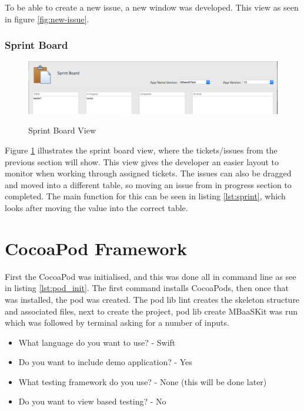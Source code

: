 To be able to create a new issue, a new window was developed. This view as seen in figure \ref{fig:new-issue}.

\subsubsection{Sprint Board}

\begin{figure}[!h]
    \caption{Sprint Board View}
    \centering
    \includegraphics[width=150mm]{images/dashboard/sprint-board}
    \label{fig:sprint-board-view}
\end{figure} 

Figure \ref{fig:sprint-board-view} illustrates the sprint board view, where the tickets/issues from the previous section will show. This view gives the developer an easier layout to monitor when working through assigned tickets. The issues can also be dragged and moved into a different table, so moving an issue from in progress section to completed. The main function for this can be seen in listing \ref{lst:sprint}, which looks after moving the value into the correct table.



\section{CocoaPod Framework}

First the CocoaPod was initialised, and this was done all in command line as see in listing \ref{lst:pod_init}. The first command installs CocoaPods, then once that was installed, the pod was created. The pod lib lint creates the skeleton structure and associated files, next to create the project, pod lib create MBaaSKit was run which was followed by terminal asking for a number of inputs.



\begin{itemize}
  \item What language do you want to use?
  - Swift
  \item Do you want to include demo application?
  - Yes
  \item What testing framework do you use?
  - None (this will be done later)
  \item Do you want to view based testing?
  - No
\end{itemize}

